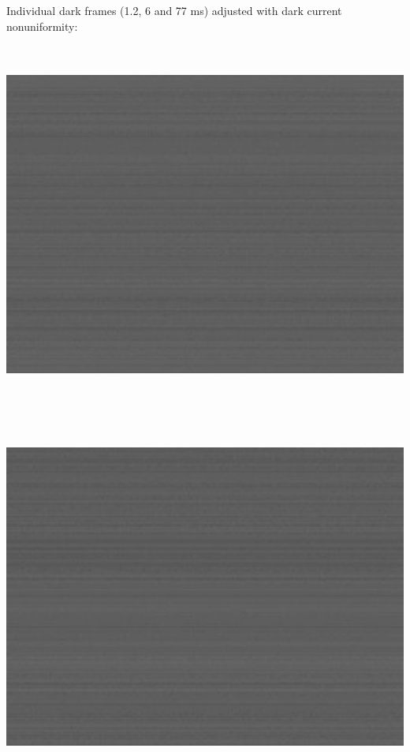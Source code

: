 Individual dark frames (1.2, 6 and 77 ms) adjusted with dark current nonuniformity: 

\begin{center}
\includegraphics[height=12cm]{images/blackframes-gainx1-offset2047-1ms-01-darkcurrent-no-blackcol}
\end{center}

\begin{center}
\includegraphics[height=12cm]{images/blackframes-gainx1-offset2047-5ms-01-darkcurrent-no-blackcol}
\end{center}

